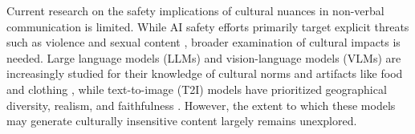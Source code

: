 
Current research on the safety implications of cultural nuances in non-verbal communication is limited. While AI safety efforts primarily target explicit threats such as violence and sexual content \cite{han2024wildguard, Deng2023HarnessingLT, Riccio2024ExploringTB}, broader examination of cultural impacts is needed. Large language models (LLMs) and vision-language models (VLMs) are increasingly studied for their knowledge of cultural norms and artifacts like food and clothing \cite{Yin2021BroadenTV, romero2024cvqa, rao2024normad}, while text-to-image (T2I) models have prioritized geographical diversity, realism, and faithfulness \cite{hall2023dig, hall2024towards, kannen2024beyond}. However, the extent to which these models may generate culturally insensitive content largely remains unexplored.



